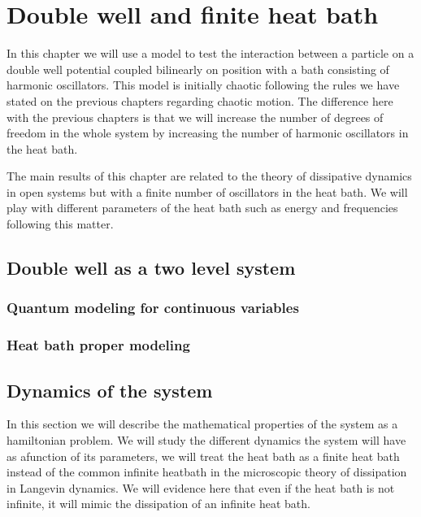 \pagestyle{fancy}
\fancyhf{}
\rhead{\rightmark}
\lhead{\thepage}

\chapter{Double well and finite heat bath}

In this chapter we will use a model to test the interaction between a particle on a double well potential coupled bilinearly on position with a bath consisting of harmonic oscillators. This model is initially chaotic following the rules we have stated on the previous chapters regarding chaotic motion. The difference here with the previous chapters is that we will increase the number of degrees of freedom in the whole system by increasing the number of harmonic oscillators in the heat bath\cite{dittrich2019quantum}.\par 

The main results of this chapter are related to the theory of  dissipative dynamics in open systems but with a finite number of oscillators in the heat bath. We will play with different parameters of the heat bath such as energy and frequencies following this matter.\par 





\section{Double well as a two level system}


\subsection{Quantum modeling for continuous variables}

\subsection{Heat bath proper modeling}

\section{Dynamics of the system}
In this section we will describe the mathematical properties of the system as a hamiltonian problem. We will study the different dynamics the system will have as afunction of its parameters, we will treat the heat bath as a finite heat bath instead of the common infinite heatbath in the microscopic theory of dissipation in Langevin dynamics. We will evidence here that even if the heat bath is not infinite, it will mimic the dissipation of an infinite heat bath.

